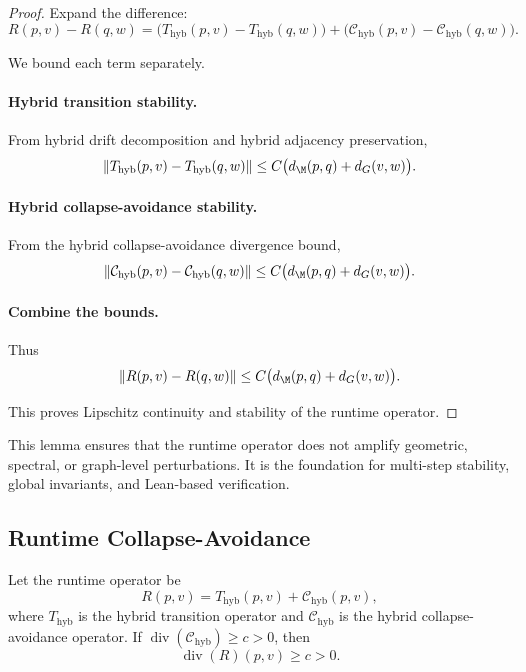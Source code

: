 \begin{proof}
Expand the difference:
\[
R(p,v) - R(q,w)
=
\big(T_{\mathrm{hyb}}(p,v) - T_{\mathrm{hyb}}(q,w)\big)
+
\big(\mathcal{C}_{\mathrm{hyb}}(p,v) - \mathcal{C}_{\mathrm{hyb}}(q,w)\big).
\]

We bound each term separately.

\paragraph{Hybrid transition stability.}
From hybrid drift decomposition and hybrid adjacency preservation,
\[
\|T_{\mathrm{hyb}}(p,v) - T_{\mathrm{hyb}}(q,w)\|
\le
C\big(d_\M(p,q) + d_G(v,w)\big).
\]

\paragraph{Hybrid collapse-avoidance stability.}
From the hybrid collapse-avoidance divergence bound,
\[
\|\mathcal{C}_{\mathrm{hyb}}(p,v) - \mathcal{C}_{\mathrm{hyb}}(q,w)\|
\le
C\big(d_\M(p,q) + d_G(v,w)\big).
\]

\paragraph{Combine the bounds.}
Thus
\[
\|R(p,v) - R(q,w)\|
\le
C\big(d_\M(p,q) + d_G(v,w)\big).
\]

This proves Lipschitz continuity and stability of the runtime operator.
\end{proof}

\begin{remark}
This lemma ensures that the runtime operator does not amplify geometric,
spectral, or graph-level perturbations. It is the foundation for
multi-step stability, global invariants, and Lean-based verification.
\end{remark}

\subsection{Runtime Collapse-Avoidance}

\begin{lemma}
Let the runtime operator be
\[
R(p,v)
=
T_{\mathrm{hyb}}(p,v)
+
\mathcal{C}_{\mathrm{hyb}}(p,v),
\]
where $T_{\mathrm{hyb}}$ is the hybrid transition operator and
$\mathcal{C}_{\mathrm{hyb}}$ is the hybrid collapse-avoidance operator.
If $\operatorname{div}(\mathcal{C}_{\mathrm{hyb}}) \ge c > 0$, then
\[
\operatorname{div}(R)(p,v) \ge c > 0.
\]
\end{lemma}


